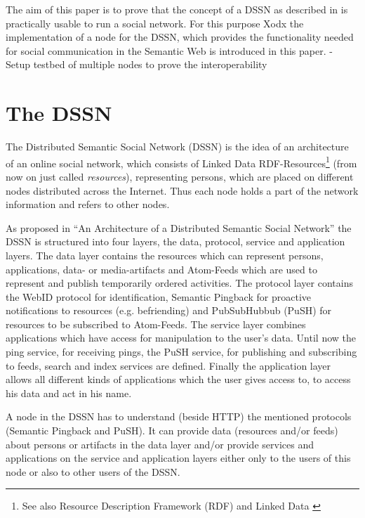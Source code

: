 \documentclass{llncs}
\begin{document}
The aim of this paper is to prove that the concept of a DSSN as described in \cite{tramp-s-2012--a} is practically usable to run a social network.
For this purpose Xodx the implementation of a node for the DSSN, which provides the functionality needed for social communication in the Semantic Web is introduced in this paper.
- Setup testbed of multiple nodes to prove the interoperability


\section{The DSSN}
The Distributed Semantic Social Network (DSSN) is the idea of an architecture of an online social network, which consists of Linked Data RDF-Resources\footnote{See also Resource Description Framework (RDF) \cite{lassila-o-1999--a} and Linked Data \cite{bernerslee-t-2009--}} (from now on just called \emph{resources}), representing persons, which are placed on different nodes distributed across the Internet.
Thus each node holds a part of the network information and refers to other nodes.

As proposed in “An Architecture of a Distributed Semantic Social Network” \cite{tramp-s-2012--a} the DSSN is structured into four layers, the data, protocol, service and application layers.
The data layer contains the resources which can represent persons, applications, data- or media-artifacts and Atom-Feeds which are used to represent and publish temporarily ordered activities.
The protocol layer contains the WebID protocol for identification, Semantic Pingback \cite{tramp-s-2010--b} for proactive notifications to resources (e.g. befriending) and PubSubHubbub (PuSH) for resources to be subscribed to Atom-Feeds.
The service layer combines applications which have access for manipulation to the user's data. Until now the ping service, for receiving pings, the PuSH service, for publishing and subscribing to feeds, search and index services are defined.
Finally the application layer allows all different kinds of applications which the user gives access to, to access his data and act in his name.

A node in the DSSN has to understand (beside HTTP) the mentioned protocols (Semantic Pingback and PuSH).
It can provide data (resources and/or feeds) about persons or artifacts in the data layer and/or provide services and applications on the service and application layers either only to the users of this node or also to other users of the DSSN.
\end{document}
